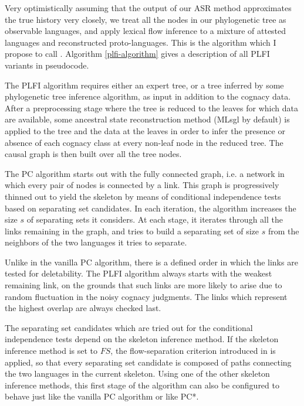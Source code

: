 Very optimistically assuming that the output of our ASR method approximates the true history very closely, we treat all the nodes in our phylogenetic tree as observable languages, and apply lexical flow inference to a mixture of attested languages and reconstructed proto-languages. This is the algorithm which I propose to call . Algorithm \ref{plfi-algorithm} gives a description of all PLFI variants in pseudocode.

The PLFI algorithm requires either an expert tree, or a tree inferred by some phylogenetic tree inference algorithm, as input in addition to the cognacy data. After a preprocessing stage where the tree is reduced to the leaves for which data are available, some ancestral state reconstruction method (MLsgl by default) is applied to the tree and the data at the leaves in order to infer the presence or absence of each cognacy class at every non-leaf node in the reduced tree. The causal graph is then built over all the tree nodes.

The PC algorithm starts out with the fully connected graph, i.e. a network in which every pair of nodes is connected by a link. This graph is progressively thinned out to yield the skeleton by means of conditional independence tests based on separating set candidates. In each iteration, the algorithm increases the size $s$ of separating sets it considers. At each stage, it iterates through all the links remaining in the graph, and tries to build a separating set of size $s$ from the neighbors of the two languages it tries to separate.

Unlike in the vanilla PC algorithm, there is a defined order in which the links are tested for deletability. The PLFI algorithm always starts with the weakest remaining link, on the grounds that such links are more likely to arise due to random fluctuation in the noisy cognacy judgments. The links which represent the highest overlap are always checked last.

The separating set candidates which are tried out for the conditional independence tests depend on the skeleton inference method. If the skeleton inference method is set to $FS$, the flow-separation criterion introduced in  is applied, so that every separating set candidate is composed of paths connecting the two languages in the current skeleton. Using one of the other skeleton inference methods, this first stage of the algorithm can also be configured to behave just like the vanilla PC algorithm or like PC*.

